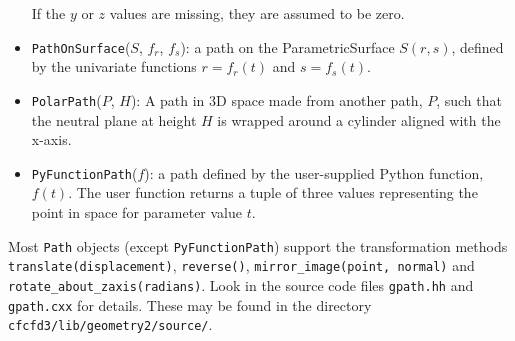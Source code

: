 \begin{itemize}
  If the $y$ or $z$ values are missing, they are assumed to be zero.
\item \texttt{PathOnSurface}($S$, $f_r$, $f_s$): a path on the
  ParametricSurface $S(r,s)$, defined by the univariate functions 
  $r=f_r(t)$ and $s=f_s(t)$.
\item \texttt{PolarPath}($P$, $H$): A path in 3D space made from another path, $P$,
  such that the neutral plane at height $H$ is wrapped around a cylinder aligned with
  the x-axis.
\item \texttt{PyFunctionPath}($f$): a path defined by the user-supplied Python function, $f(t)$.
  The user function returns a tuple of three values representing the point in space 
  for parameter value $t$.
\end{itemize}

Most \texttt{Path} objects (except \texttt{PyFunctionPath}) support the transformation methods
\texttt{translate(displacement)}, 
\texttt{reverse()}, 
\texttt{mirror\_image(point, normal)} and \\
\texttt{rotate\_about\_zaxis(radians)}.
Look in the source code files \texttt{gpath.hh} and \texttt{gpath.cxx} for details.
These may be found in the directory \texttt{cfcfd3/lib/geometry2/source/}.

